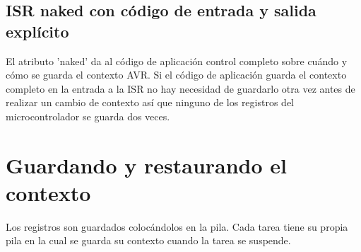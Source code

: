\documentclass[12pt]{article}
\begin{document}
\subsection*{ISR naked con código de entrada y salida explícito}
El atributo 'naked' da al código de aplicación control completo sobre 
cuándo y cómo se guarda el contexto AVR. Si el código de aplicación 
guarda el contexto completo en la entrada a la ISR no hay necesidad de 
guardarlo otra vez antes de realizar un cambio de contexto así que 
ninguno de los registros del microcontrolador se guarda dos veces.
\section{Guardando y restaurando el contexto}
Los registros son guardados colocándolos en la pila. Cada tarea tiene 
su propia pila en la cual se guarda su contexto cuando la tarea se 
suspende.
\end{document}
